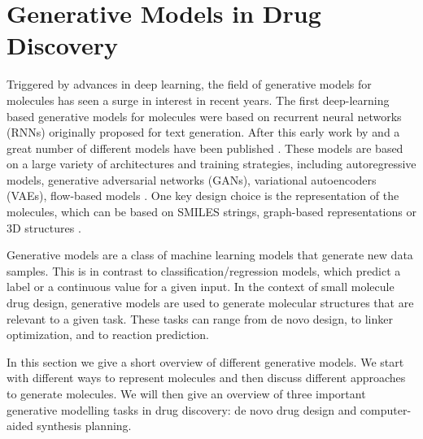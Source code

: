 \newpage
\section{Generative Models in Drug Discovery\label{sec:generative-models}}
Triggered by advances in deep learning, the field of generative models for molecules has seen a
surge in interest in recent years. The first deep-learning based generative models for molecules
were based on recurrent neural networks (RNNs) originally proposed for text generation. After this
early work by \citep{seglerGeneratingFocusedMolecule2018} and
\citep{gomez-bombarelliAutomaticChemicalDesign2018} a great number of different models have been
published \citep{eltonDeepLearningMolecular2019,sanchez-lengelingInverseMolecularDesign2018}. These
models are based on a large variety of architectures and training strategies, including
autoregressive models, generative adversarial networks (GANs), variational autoencoders (VAEs),
flow-based models \citep{madhawaGraphNVPInvertibleFlow2019}. One key design choice is the
representation of the molecules, which can be based on SMILES strings, graph-based representations
or 3D structures
\citep{eltonDeepLearningMolecular2019,sanchez-lengelingInverseMolecularDesign2018,pangDeepGenerativeModels2024}.

Generative models are a class of machine learning models that generate new data samples. This is in
contrast to classification/regression models, which predict a label or a continuous value for a
given input. In the context of small molecule drug design, generative models are used to generate
molecular structures that are relevant to a given task. These tasks can range from de novo design, to linker optimization,
and to reaction prediction.

In this section we give a short overview of different generative models. We start with different
ways to represent molecules and then discuss different approaches to generate molecules. We will
then give an overview of three important generative modelling tasks in drug discovery: de novo drug
design and computer-aided synthesis planning.



